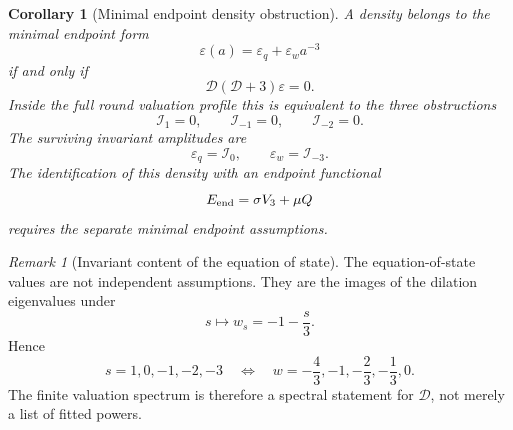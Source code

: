 \documentclass[11pt,a4paper]{article}
\numberwithin{equation}{section}
\newtheorem{corollary}[criterion]{Corollary}
\theoremstyle{remark}
\newtheorem{remark}[criterion]{Remark}
\newcommand{\Dil}{\mathscr{D}}
\begin{document}
\begin{corollary}[Minimal endpoint density obstruction]
A density belongs to the minimal endpoint form
\begin{equation}
\varepsilon(a)=\varepsilon_q+\varepsilon_w a^{-3}
\end{equation}
if and only if
\begin{equation}
\boxed{
\Dil(\Dil+3)\varepsilon=0 .
}
\end{equation}
Inside the full round valuation profile this is equivalent to the three obstructions
\begin{equation}
\mathcal{I}_1=0,
\qquad
\mathcal{I}_{-1}=0,
\qquad
\mathcal{I}_{-2}=0.
\end{equation}
The surviving invariant amplitudes are
\begin{equation}
\varepsilon_q=\mathcal{I}_0,
\qquad
\varepsilon_w=\mathcal{I}_{-3}.
\end{equation}
The identification of this density with an endpoint functional
\begin{equation}
E_{\rm end}=\sigma V_3+\mu Q
\end{equation}
requires the separate minimal endpoint assumptions.
\end{corollary}

\begin{remark}[Invariant content of the equation of state]
The equation-of-state values are not independent assumptions. They are the images of the dilation eigenvalues under
\begin{equation}
s\longmapsto w_s=-1-\frac{s}{3}.
\end{equation}
Hence
\begin{equation}
s=1,0,-1,-2,-3
\quad\Longleftrightarrow\quad
w=-\frac43,-1,-\frac23,-\frac13,0.
\end{equation}
The finite valuation spectrum is therefore a spectral statement for \(\Dil\), not merely a list of fitted powers.
\end{remark}
\end{document}
